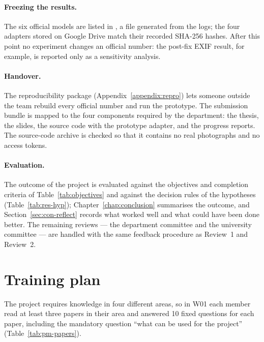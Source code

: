 \paragraph{Freezing the results.} The six official models are listed in
, a file generated from the logs; the four adapters stored
on Google Drive match their recorded SHA-256 hashes. After this point no experiment changes
an official number: the post-fix EXIF result, for example, is reported only as a sensitivity
analysis.

\paragraph{Handover.} The reproducibility package (Appendix~\ref{appendix:repro}) lets someone
outside the team rebuild every official number and run the prototype. The submission bundle
is mapped to the four components required by the department: the thesis, the slides, the
source code with the prototype adapter, and the progress reports. The source-code archive is
checked so that it contains no real photographs and no access tokens.

\paragraph{Evaluation.} The outcome of the project is evaluated against the objectives and
completion criteria of Table~\ref{tab:objectives} and against the decision rules of the
hypotheses (Table~\ref{tab:res-hyp}); Chapter~\ref{chap:conclusion} summarises the outcome,
and Section~\ref{sec:con-reflect} records what worked well and what could have been done
better. The remaining reviews --- the department committee and the university committee ---
are handled with the same feedback procedure as Review~1 and Review~2.

\section{Training plan}
\label{sec:pm-training}

The project requires knowledge in four different areas, so in W01 each member read at least
three papers in their area and answered 10 fixed questions for each paper, including the
mandatory question ``what can be used for the project'' (Table~\ref{tab:pm-papers}).

